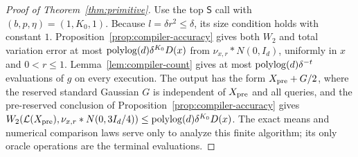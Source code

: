 \begin{proof}[Proof of Theorem~\ref{thm:primitive}]
Use the top $\mathsf S$ call with $(b,p,\eta)=(1,K_0,1)$.
Because $l=\delta r^2\le\delta$, its size condition holds with
constant $1$.  Proposition~\ref{prop:compiler-accuracy} gives both
$W_2$ and total variation error at most
$\operatorname{polylog}(d)\delta^{K_0}D(x)$ from
$\nu_{x,r}*N(0,I_d)$, uniformly in $x$ and $0<r\le1$.
Lemma~\ref{lem:compiler-count} gives at most
$\operatorname{polylog}(d)\delta^{-t}$ evaluations of $g$ on every execution.
The output has the form $X_{\rm pre}+G/2$, where the reserved standard
Gaussian $G$ is independent of $X_{\rm pre}$ and all queries, and the
pre-reserved conclusion of Proposition~\ref{prop:compiler-accuracy}
gives $W_2(\mathcal L(X_{\rm pre}),\nu_{x,r}*N(0,3I_d/4))
\le\operatorname{polylog}(d)\delta^{K_0}D(x)$.
The exact means and numerical comparison laws serve only to analyze this finite
algorithm; its only oracle operations are the terminal evaluations.
\end{proof}
